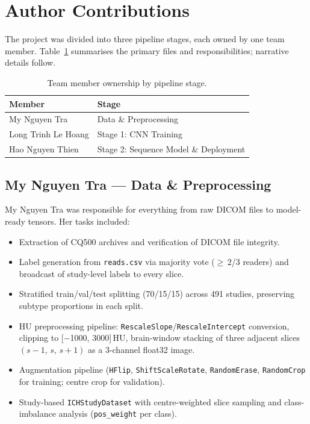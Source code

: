 \appendices
\section{Author Contributions}

The project was divided into three pipeline stages, each owned by one team
member. Table~\ref{tab:contributions} summarises the primary files and
responsibilities; narrative details follow.

\begin{table}[h]
\centering
\caption{Team member ownership by pipeline stage.}
\label{tab:contributions}
\renewcommand{\arraystretch}{1.25}
\begin{tabular}{@{} l l @{}}
\toprule
\textbf{Member} & \textbf{Stage} \\
\midrule
My Nguyen Tra       & Data \& Preprocessing \\
Long Trinh Le Hoang & Stage 1: CNN Training \\
Hao Nguyen Thien    & Stage 2: Sequence Model \& Deployment \\
\bottomrule
\end{tabular}
\end{table}

\subsection*{My Nguyen Tra — Data \& Preprocessing}

My Nguyen Tra was responsible for everything from raw DICOM files to
model-ready tensors. Her tasks included:
\begin{itemize}
    \item Extraction of CQ500 archives and verification of DICOM file integrity.
    \item Label generation from \texttt{reads.csv} via majority vote
          ($\geq$\,2/3 readers) and broadcast of study-level labels to
          every slice.
    \item Stratified train/val/test splitting (70/15/15) across 491
          studies, preserving subtype proportions in each split.
    \item HU preprocessing pipeline: \texttt{RescaleSlope}/\texttt{RescaleIntercept}
          conversion, clipping to [$-$1000, 3000]\,HU, brain-window
          stacking of three adjacent slices $(s-1,\,s,\,s+1)$ as a
          3-channel float32 image.
    \item Augmentation pipeline (\texttt{HFlip}, \texttt{ShiftScaleRotate},
          \texttt{RandomErase}, \texttt{RandomCrop} for training;
          centre crop for validation).
    \item Study-based \texttt{ICHStudyDataset} with centre-weighted
          slice sampling and class-imbalance analysis
          (\texttt{pos\_weight} per class).
\end{itemize}

